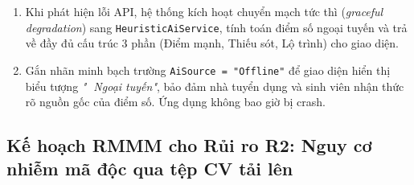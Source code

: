 \begin{itemize}
    \begin{enumerate}
        \item Khi phát hiện lỗi API, hệ thống kích hoạt chuyển mạch tức thì (\textit{graceful degradation}) sang \texttt{HeuristicAiService}, tính toán điểm số ngoại tuyến và trả về đầy đủ cấu trúc 3 phần (Điểm mạnh, Thiếu sót, Lộ trình) cho giao diện.
        \item Gắn nhãn minh bạch trường \texttt{AiSource = "Offline"} để giao diện hiển thị biểu tượng \textit{"📴 Ngoại tuyến"}, bảo đảm nhà tuyển dụng và sinh viên nhận thức rõ nguồn gốc của điểm số. Ứng dụng không bao giờ bị crash.
    \end{enumerate}
\end{itemize}

\subsection{Kế hoạch RMMM cho Rủi ro R2: Nguy cơ nhiễm mã độc qua tệp CV tải lên}
